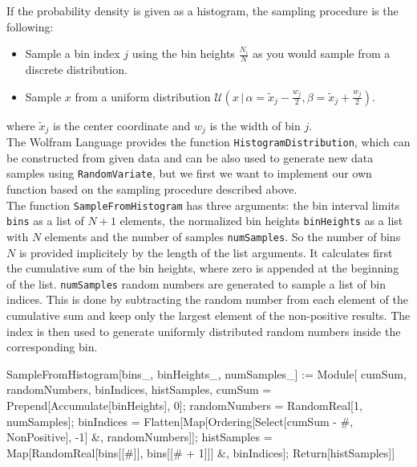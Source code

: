 \documentclass{tstextbook}
\begin{document}
\begin{example}
If the probability density is given as a histogram, the sampling procedure is the following:
\begin{itemize}
\item Sample a bin index $j$ using the bin heights $\frac{N_i}{N}$ as you would sample from a discrete distribution.
\item Sample $x$ from a uniform distribution $\mathcal{U}\left(x\,\vert\,\alpha=\tilde{x}_j-\frac{w_j}{2},\beta=\tilde{x}_j+\frac{w_j}{2}\right)$.
\end{itemize}
where $\tilde{x}_j$ is the center coordinate and $w_j$ is the width of bin $j$.\\

The Wolfram Language provides the function \texttt{HistogramDistribution}, which can be constructed from given data and can be also used to generate new data samples using \texttt{RandomVariate}, but we first we want to implement our own function based on the sampling procedure described above. \\

The function \texttt{SampleFromHistogram} has three arguments: the bin interval limits \texttt{bins} as a list of $N+1$ elements, the normalized bin heights \texttt{binHeights} as a list with $N$ elements and the number of samples \texttt{numSamples}. So the number of bins $N$ is provided implicitely by the length of the list arguments. It calculates first the cumulative sum of the bin heights, where zero is appended at the beginning of the list. \texttt{numSamples} random numbers are generated to sample a list of bin indices. This is done by subtracting the random number from each element of the cumulative sum and keep only the largest element of the non-positive results. The index is then used to generate uniformly distributed random numbers inside the corresponding bin.
\begin{mathematica}
SampleFromHistogram[bins_, binHeights_, numSamples_] := Module[
  {cumSum, randomNumbers, binIndices, histSamples},
  cumSum = Prepend[Accumulate[binHeights], 0];
  randomNumbers = RandomReal[1, numSamples];
  binIndices = Flatten[Map[Ordering[Select[cumSum - #, NonPositive], -1] &, 
                           randomNumbers]];
  histSamples = Map[RandomReal[{bins[[#]], bins[[# + 1]]}] &, binIndices];
  Return[histSamples]]


\end{mathematica}
\end{example}
\end{document}
